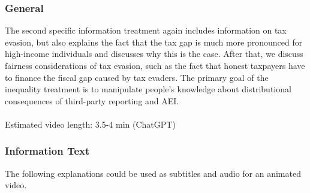\documentclass[11pt]{article}
\begin{document}
\subsubsection*{General}
The second specific information treatment again includes information on tax evasion, but also explains the fact that the tax gap is much more pronounced for high-income individuals and discusses why this is the case. After that, we discuss fairness considerations of tax evasion, such as the fact that honest taxpayers have to finance the fiscal gap caused by tax evaders. The primary goal of the inequality treatment is to manipulate people’s knowledge about distributional consequences of third-party reporting and AEI.\\ \\  
Estimated video length: 3.5-4 min (ChatGPT)
\subsubsection*{Information Text}
The following explanations could be used as subtitles and audio for an animated video.
\end{document}
